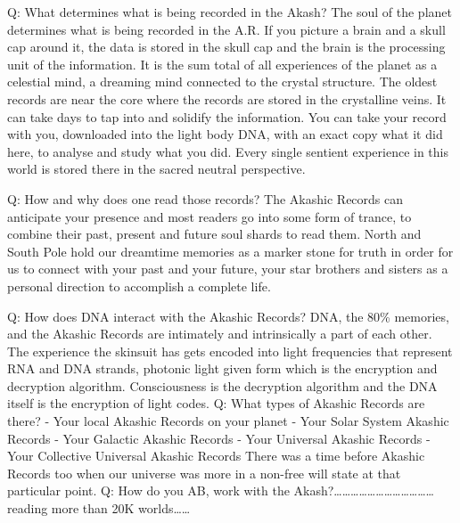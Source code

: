 Q: What determines what is being recorded in the Akash? The soul of the
planet determines what is being recorded in the A.R. If you picture a
brain and a skull cap around it, the data is stored in the skull cap and
the brain is the processing unit of the information. It is the sum total
of all experiences of the planet as a celestial mind, a dreaming mind
connected to the crystal structure. The oldest records are near the core
where the records are stored in the crystalline veins. It can take days
to tap into and solidify the information. You can take your record with
you, downloaded into the light body DNA, with an exact copy what it did
here, to analyse and study what you did. Every single sentient
experience in this world is stored there in the sacred neutral
perspective.

Q: How and why does one read those records? The Akashic Records can
anticipate your presence and most readers go into some form of trance,
to combine their past, present and future soul shards to read them.
North and South Pole hold our dreamtime memories as a marker stone for
truth in order for us to connect with your past and your future, your
star brothers and sisters as a personal direction to accomplish a
complete life.

Q: How does DNA interact with the Akashic Records? DNA, the 80\%
memories, and the Akashic Records are intimately and intrinsically a
part of each other. The experience the skinsuit has gets encoded into
light frequencies that represent RNA and DNA strands, photonic light
given form which is the encryption and decryption algorithm.
Consciousness is the decryption algorithm and the DNA itself is the
encryption of light codes. Q: What types of Akashic Records are there? -
Your local Akashic Records on your planet - Your Solar System Akashic
Records - Your Galactic Akashic Records - Your Universal Akashic Records
- Your Collective Universal Akashic Records There was a time before
Akashic Records too when our universe was more in a non-free will state
at that particular point. Q: How do you AB, work with the
Akash?\ldots{}\ldots{}\ldots{}\ldots{}\ldots{}\ldots{}\ldots{}\ldots{}\ldots{}\ldots{}\ldots{}\ldots{}
reading more than 20K worlds\ldots{}\ldots{}
